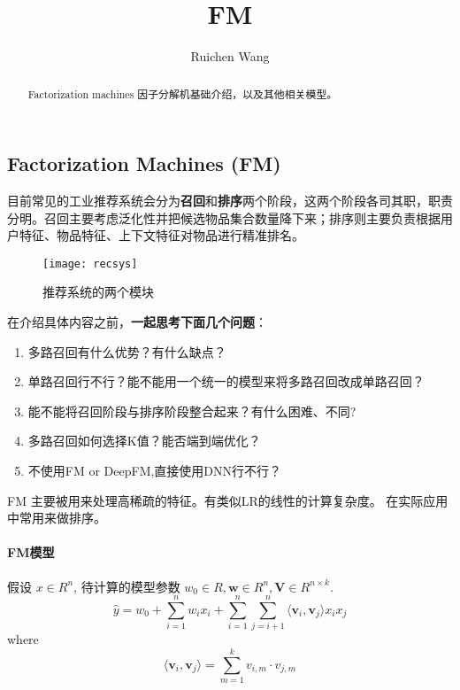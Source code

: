 \documentclass{article}
\author{Ruichen Wang}
\title{FM}
\begin{document}
\begin{CJK*}{UTF8}{gbsn}

\maketitle
\begin{abstract}
Factorization machines 因子分解机基础介绍，以及其他相关模型。
\end{abstract}

\tableofcontents

\section{Factorization Machines (FM)}
目前常见的工业推荐系统会分为\textbf{召回}和\textbf{排序}两个阶段，这两个阶段各司其职，职责分明。召回主要考虑泛化性并把候选物品集合数量降下来；排序则主要负责根据用户特征、物品特征、上下文特征对物品进行精准排名。

\begin{figure}[H]
\centering
\texttt{[image: recsys]}
\caption{推荐系统的两个模块}
\end{figure}

在介绍具体内容之前，\textbf{一起思考下面几个问题}：
\begin{enumerate}
\item{多路召回有什么优势？有什么缺点？}
\item{单路召回行不行？能不能用一个统一的模型来将多路召回改成单路召回？}
\item{能不能将召回阶段与排序阶段整合起来？有什么困难、不同?}
\item{多路召回如何选择K值？能否端到端优化？}
\item{不使用FM or DeepFM,直接使用DNN行不行？}
\end{enumerate}


FM \cite{DBLP:conf/icdm/Rendle10} 主要被用来处理高稀疏的特征。有类似LR的线性的计算复杂度。 在实际应用中常用来做排序。

\paragraph{FM模型} 假设 $x \in R^{n}$, 待计算的模型参数 $ w_{0} \in R, \textbf{w} \in R^{n}, \textbf{V} \in R^{n \times k}$.
$$\widehat{y}= w_{0}+\sum_{i=1}^{n}w_{i}x_{i}+\sum_{i=1}^{n}\sum_{j=i+1}^{n}\langle \textbf{v}_{i} ,\textbf{v}_{j} \rangle x_{i}x_{j}$$
where 
$$\langle \textbf{v}_{i} ,\textbf{v}_{j} \rangle =\sum_{m=1}^{k}v_{i,m} \cdot v_{j,m}$$


\end{CJK*}
\end{document}
